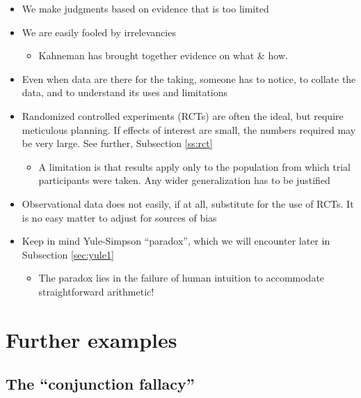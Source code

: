 \documentclass[
  10pt,
  b5paper]{book}
\providecommand{\tightlist}{%
  \setlength{\itemsep}{0pt}\setlength{\parskip}{0pt}}
\begin{document}
\begin{itemize}
\tightlist
\item
  We make judgments based on evidence that is too limited
\item
  We are easily fooled by irrelevancies

  \begin{itemize}
  \tightlist
  \item
    Kahneman has brought together evidence on what \& how.
  \end{itemize}
\item
  Even when data are there for the taking, someone has to notice, to collate the data, and to understand its uses and limitations
\item
  Randomized controlled experiments (RCTs) are often the ideal, but require meticulous planning. If effects of interest are small, the numbers required may be very large. See further, Subsection \ref{ss:rct}

  \begin{itemize}
  \tightlist
  \item
    A limitation is that results apply only to the population from which
    trial participants were taken. Any wider generalization has to be justified
  \end{itemize}
\item
  Observational data does not easily, if at all, substitute for the use of RCTs. It is no easy matter to adjust for sources of bias
\item
  Keep in mind Yule-Simpson ``paradox'', which we will encounter later in Subsection \ref{sec:yule1}

  \begin{itemize}
  \tightlist
  \item
    The paradox lies in the failure of human intuition to accommodate straightforward arithmetic!
  \end{itemize}
\end{itemize}

\hypertarget{further-examples}{%
\section{Further examples}\label{further-examples}}

\hypertarget{the-conjunction-fallacy}{%
\subsection*{The ``conjunction fallacy''}\label{the-conjunction-fallacy}}
\end{document}
